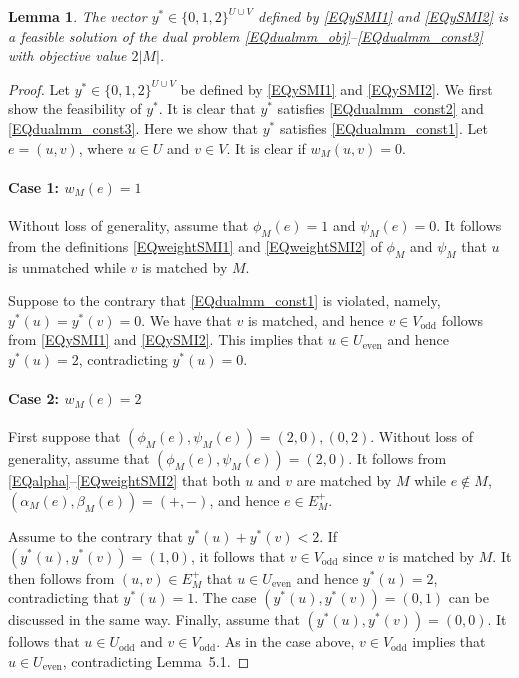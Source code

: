 \documentclass[11pt,a4paper,showkeys]{article}
\theoremstyle{plain}
\newtheorem{lemma}[theorem]{Lemma}
\theoremstyle{definition}
\newcommand{\Ueven}{U_{\mathrm{even}}}
\newcommand{\Vodd}{V_{\mathrm{odd}}}
\begin{document}
\begin{lemma}
    The vector $y^*\in \{0,1,2\}^{U\cup V}$ 
    defined by \eqref{EQySMI1} and \eqref{EQySMI2} is 
    a feasible solution of the dual problem \eqref{EQdualmm_obj}--\eqref{EQdualmm_const3} 
    with objective value $2|M|$. 
\end{lemma}


\begin{proof}
    Let $y^*\in \{0,1,2\}^{U\cup V}$ be 
    defined by \eqref{EQySMI1} and \eqref{EQySMI2}. 
    We first show the feasibility of $y^*$. 
    It is clear that $y^*$ satisfies \eqref{EQdualmm_const2} and \eqref{EQdualmm_const3}. 
    Here we show that $y^*$ satisfies \eqref{EQdualmm_const1}. 
    Let $e=(u,v)$, 
    where $u\in U$ and $v\in V$. 
    It is clear if $w_M(u,v)=0$. 

    \paragraph{Case 1: $w_M(e)=1$}
    Without loss of generality, assume that $\phi_M(e)=1$ and $\psi_M(e)=0$. 
    It follows from the definitions \eqref{EQweightSMI1} and \eqref{EQweightSMI2} of $\phi_M$ and $\psi_M$ that 
    $u$ is unmatched while $v$ is matched by $M$. 

    Suppose to the contrary that \eqref{EQdualmm_const1} is violated, 
    namely, 
    $y^*(u)=y^*(v)=0$. 
    We have that $v$ is matched, 
    and hence $v\in \Vodd$ follows from \eqref{EQySMI1} and \eqref{EQySMI2}. 
    This implies that $u\in \Ueven$ and hence $y^*(u)=2$, 
    contradicting $y^*(u)=0$. 

    \paragraph{Case 2: $w_M(e) = 2$}
    First suppose that $(\phi_M(e), \psi_M(e))=(2,0),(0,2)$. 
    Without loss of generality, 
    assume that $(\phi_M(e), \psi_M(e))=(2,0)$. 
    It follows from \eqref{EQalpha}--\eqref{EQweightSMI2} that 
    both $u$ and $v$ are matched by $M$ while $e\not\in M$, 
    $(\alpha_M(e),\beta_M(e))=(+,-)$, 
    and hence $e\in E_M^+$. 

    
    Assume to the contrary that $y^*(u)+y^*(v)<2$. 
    If $(y^*(u),y^*(v))=(1,0)$, 
    it follows that $v\in \Vodd$ since $v$ is matched by $M$. 
    It then follows from $(u,v)\in E_M^+$ that $u\in \Ueven$ and hence $y^*(u)=2$, 
    contradicting that $y^*(u)=1$. 
    The case $(y^*(u),y^*(v))=(0,1)$ can be discussed in the same way. 
Finally, assume that $(y^*(u),y^*(v))=(0,0)$.
It follows that $u\in U_{\mathrm{odd}}$ and $v\in V_{\mathrm{odd}}$.
As in the case above, $v\in V_{\mathrm{odd}}$ implies that
$u\in U_{\mathrm{even}}$, contradicting Lemma~5.1.
    


\end{proof}
\end{document}
